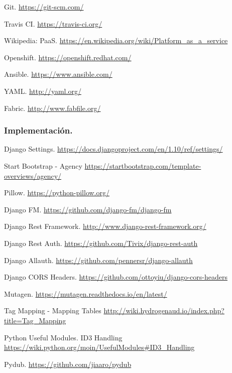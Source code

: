  Git. \url{https://git-scm.com/}

 Travis CI. \url{https://travis-ci.org/}

 Wikipedia: PaaS. \url{https://en.wikipedia.org/wiki/Platform_as_a_service}

 Openshift. \url{https://openshift.redhat.com/}

 Ansible. \url{https://www.ansible.com/}

 YAML. \url{http://yaml.org/}

 Fabric. \url{http://www.fabfile.org/}

\subsubsection*{Implementación.}

 Django Settings. \url{https://docs.djangoproject.com/en/1.10/ref/settings/}

 Start Bootstrap - Agency \url{https://startbootstrap.com/template-overviews/agency/}

 Pillow. \url{https://python-pillow.org/}

 Django FM. \url{https://github.com/django-fm/django-fm}

 Django Rest Framework. \url{http://www.django-rest-framework.org/}

 Django Rest Auth. \url{https://github.com/Tivix/django-rest-auth}

 Django Allauth. \url{https://github.com/pennersr/django-allauth} 

 Django CORS Headers. \url{https://github.com/ottoyiu/django-cors-headers}

 Mutagen. \url{https://mutagen.readthedocs.io/en/latest/}

 Tag Mapping - Mapping Tables \url{http://wiki.hydrogenaud.io/index.php?title=Tag_Mapping}

 Python Useful Modules. ID3 Handling \url{https://wiki.python.org/moin/UsefulModules#ID3_Handling}

 Pydub. \url{https://github.com/jiaaro/pydub}

